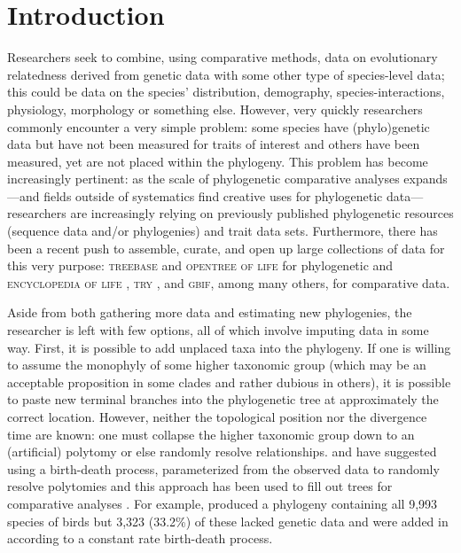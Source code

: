 \documentclass[a4paper,11pt]{article}
\begin{document}
\section{Introduction}
Researchers seek to combine, using comparative methods, data on evolutionary relatedness derived from genetic data with some other type of species-level data; this could be data on the species' distribution, demography, species-interactions, physiology, morphology or something else.    However, very quickly researchers commonly encounter a very simple problem: some species have (phylo)genetic data but have not been measured for traits of interest and others have been measured, yet are not placed within the phylogeny. This problem has become increasingly pertinent: as the scale of phylogenetic comparative analyses expands---and fields outside of systematics find creative uses for phylogenetic data---researchers are increasingly relying on previously published phylogenetic resources (sequence data and/or phylogenies) and trait data sets. Furthermore,  there has been a recent push to assemble, curate, and open up large collections of data for this very purpose: \textsc{treebase} \citep{treebase} and \textsc{opentree of life} \citep{OpenTree} for phylogenetic and \textsc{encyclopedia of life} \citep{eol}, \textsc{try} \citep{try}, and \textsc{gbif}, among many others, for comparative data. 

Aside from both gathering more data and estimating new phylogenies, the researcher is left with few options, all of which involve imputing data in some way. First, it is possible to add unplaced taxa into the phylogeny. If one is willing to assume the monophyly of some higher taxonomic group (which may be an acceptable proposition in some clades and rather dubious in others), it is possible to paste new terminal branches into the phylogenetic tree at approximately the correct location. However, neither the topological position nor the divergence time are known: one must collapse the higher taxonomic group down to an (artificial) polytomy or else randomly resolve relationships. \citet{Kuhn2011} and \citet{ThomasPastis} have suggested using a birth-death process, parameterized from the observed data to randomly resolve polytomies \citep[see also][for a related approach for fossil trees]{Bapst2013} and this approach has been used to fill out trees for comparative analyses \citep{Jetz2012, Price2012, Rolland2014, Jetz2014}. For example, \citet{Jetz2012} produced a phylogeny containing all 9,993 species of birds but 3,323 (33.2\%) of these lacked genetic data and were added in according to a constant rate birth-death process. 
\end{document}
